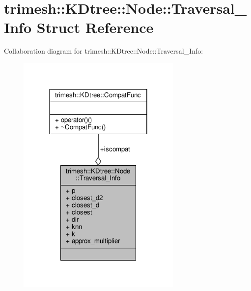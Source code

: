 \hypertarget{structtrimesh_1_1KDtree_1_1Node_1_1Traversal__Info}{}\section{trimesh\+:\+:K\+Dtree\+:\+:Node\+:\+:Traversal\+\_\+\+Info Struct Reference}
\label{structtrimesh_1_1KDtree_1_1Node_1_1Traversal__Info}


Collaboration diagram for trimesh\+:\+:K\+Dtree\+:\+:Node\+:\+:Traversal\+\_\+\+Info\+:\nopagebreak
\begin{figure}[H]
\begin{center}
\leavevmode
\includegraphics[width=228pt]{d9/d8d/structtrimesh_1_1KDtree_1_1Node_1_1Traversal__Info__coll__graph}
\end{center}
\end{figure}
